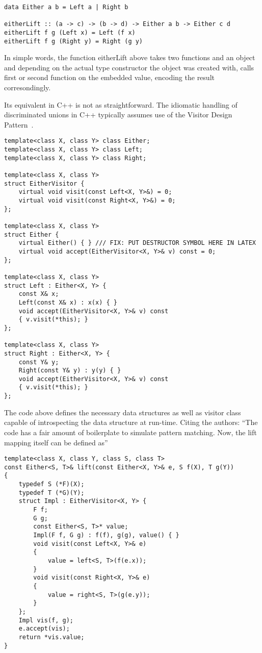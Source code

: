 \documentclass[submission,copyright]{eptcs}
\begin{document}
\begin{lstlisting}
data Either a b = Left a | Right b

eitherLift :: (a -> c) -> (b -> d) -> Either a b -> Either c d
eitherLift f g (Left x) = Left (f x)
eitherLift f g (Right y) = Right (g y)
\end{lstlisting}

In simple words, the function eitherLift above takes two functions and an 
object and depending on the actual type constructor the object was created with, 
calls first or second function on the embedded value, encoding the result 
corresondingly.

Its equivalent in C++ is not as straightforward. The idiomatic handling of 
discriminated unions in C++ typically assumes use of the Visitor Design 
Pattern~\cite{GHJV94}.

\begin{lstlisting}
template<class X, class Y> class Either;
template<class X, class Y> class Left;
template<class X, class Y> class Right;

template<class X, class Y>
struct EitherVisitor {
    virtual void visit(const Left<X, Y>&) = 0;
    virtual void visit(const Right<X, Y>&) = 0;
};

template<class X, class Y>
struct Either {
    virtual Either() { } /// FIX: PUT DESTRUCTOR SYMBOL HERE IN LATEX
    virtual void accept(EitherVisitor<X, Y>& v) const = 0;
};

template<class X, class Y>
struct Left : Either<X, Y> {
    const X& x;
    Left(const X& x) : x(x) { }
    void accept(EitherVisitor<X, Y>& v) const
    { v.visit(*this); }
};

template<class X, class Y>
struct Right : Either<X, Y> {
    const Y& y;
    Right(const Y& y) : y(y) { }
    void accept(EitherVisitor<X, Y>& v) const
    { v.visit(*this); }
};
\end{lstlisting}

The code above defines the necessary data structures as well as visitor class 
capable of introspecting the data structure at run-time. Citing the authors: 
``The code has a fair amount of boilerplate to simulate pattern matching. Now, the lift mapping itself can be defined as''

\begin{lstlisting}
template<class X, class Y, class S, class T>
const Either<S, T>& lift(const Either<X, Y>& e, S f(X), T g(Y))
{
    typedef S (*F)(X);
    typedef T (*G)(Y);
    struct Impl : EitherVisitor<X, Y> {
        F f;
        G g;
        const Either<S, T>* value;
        Impl(F f, G g) : f(f), g(g), value() { }
        void visit(const Left<X, Y>& e)
        {
            value = left<S, T>(f(e.x));
        }
        void visit(const Right<X, Y>& e)
        {
            value = right<S, T>(g(e.y));
        }
    };
    Impl vis(f, g);
    e.accept(vis);
    return *vis.value;
}
\end{lstlisting}
\end{document}
